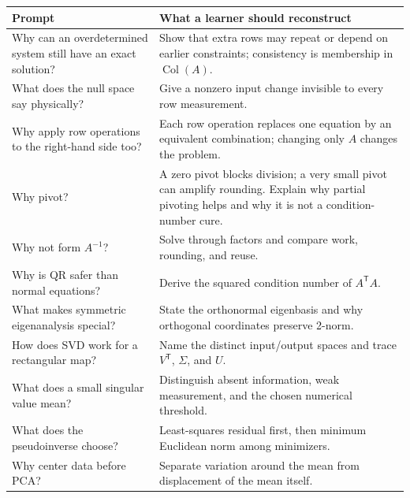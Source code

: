 {\def\LTcaptype{none} %
\begin{longtable}[]{@{}
  >{\raggedright\arraybackslash}p{}
  >{\raggedright\arraybackslash}p{}@{}}
\toprule\noalign{}
\begin{minipage}[b]{\linewidth}\raggedright
Prompt
\end{minipage} & \begin{minipage}[b]{\linewidth}\raggedright
What a learner should reconstruct
\end{minipage} \\
\midrule\noalign{}
\endhead
\bottomrule\noalign{}
\endlastfoot
Why can an overdetermined system still have an exact solution? & Show that extra rows may repeat or depend on earlier constraints; consistency is membership in \(\operatorname{Col}(A)\). \\
What does the null space say physically? & Give a nonzero input change invisible to every row measurement. \\
Why apply row operations to the right-hand side too? & Each row operation replaces one equation by an equivalent combination; changing only \(A\) changes the problem. \\
Why pivot? & A zero pivot blocks division; a very small pivot can amplify rounding. Explain why partial pivoting helps and why it is not a condition-number cure. \\
Why not form \(A^{-1}\)? & Solve through factors and compare work, rounding, and reuse. \\
Why is QR safer than normal equations? & Derive the squared condition number of \(A^\mathsf T A\). \\
What makes symmetric eigenanalysis special? & State the orthonormal eigenbasis and why orthogonal coordinates preserve 2-norm. \\
How does SVD work for a rectangular map? & Name the distinct input/output spaces and trace \(V^\mathsf T\), \(\Sigma\), and \(U\). \\
What does a small singular value mean? & Distinguish absent information, weak measurement, and the chosen numerical threshold. \\
What does the pseudoinverse choose? & Least-squares residual first, then minimum Euclidean norm among minimizers. \\
Why center data before PCA? & Separate variation around the mean from displacement of the mean itself. \\

\end{longtable}}
